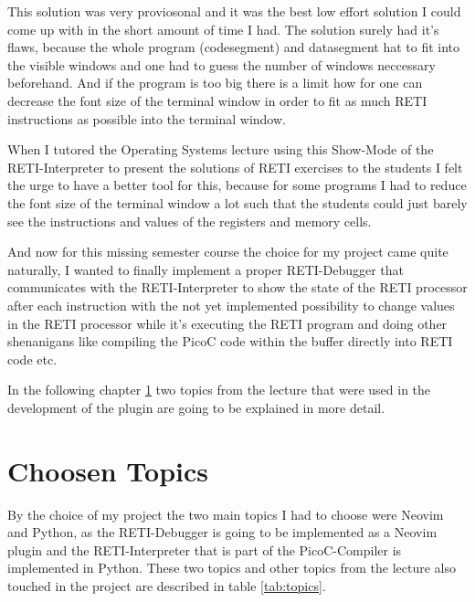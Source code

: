 \documentclass{report}
\begin{document}
This solution was very proviosonal and it was the best low effort solution I could come up with in the short amount of time I had. The solution surely had it's flaws, because the whole program (codesegment) and datasegment hat to fit into the visible windows and one had to guess the number of windows neccessary beforehand. And if the program is too big there is a limit how for one can decrease the font size of the terminal window in order to fit as much RETI instructions as possible into the terminal window.

When I tutored the Operating Systems lecture using this \alert{Show-Mode} of the RETI-Interpreter to present the solutions of RETI exercises to the students I felt the urge to have a better tool for this, because for some programs I had to reduce the font size of the terminal window a lot such that the students could just barely see the instructions and values of the registers and memory cells.

And now for this missing semester course the choice for my project came quite naturally, I wanted to finally implement a proper \alert{RETI-Debugger} that communicates with the RETI-Interpreter to show the state of the RETI processor after each instruction with the not yet implemented possibility to change values in the RETI processor while it's executing the RETI program and doing other shenanigans like compiling the PicoC code within the buffer directly into RETI code etc.

In the following chapter \ref{chap:choosen_topics} two topics from the lecture that were used in the development of the plugin are going to be explained in more detail.

\chapter{Choosen Topics}
\label{chap:choosen_topics}

By the choice of my project the two main topics I had to choose were \alert{Neovim} and \alert{Python}, as the RETI-Debugger is going to be implemented as a \alert{Neovim plugin} and the RETI-Interpreter that is part of the PicoC-Compiler is implemented in Python. These two topics and other topics from the lecture also touched in the project are described in table \ref{tab:topics}.
\end{document}
